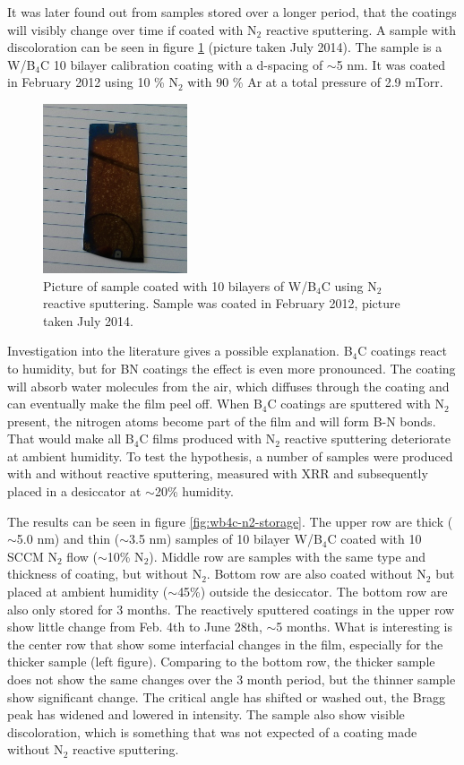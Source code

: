 It was later found out from samples stored over a longer period, that the coatings will visibly change over time if coated with N$_2$ reactive sputtering. A sample with discoloration can be seen in figure \ref{fig:discolor} (picture taken July 2014). The sample is a W/B$_4$C 10 bilayer calibration coating with a d-spacing of $\sim$5 nm. It was coated in February 2012 using 10 \% N$_2$ with 90 \% Ar at a total pressure of 2.9 mTorr.

\begin{figure}[!h]
	\center
	\includegraphics[height=5cm]{figures/athena/coatings/si5556.jpg}
\caption{\footnotesize Picture of sample coated with 10 bilayers of W/B$_4$C using N$_2$ reactive sputtering. Sample was coated in February 2012, picture taken July 2014.}\label{fig:discolor}
\end{figure}

Investigation into the literature gives a possible explanation. B$_4$C coatings react to humidity, but for BN coatings the effect is even more pronounced. The coating will absorb water molecules from the air, which diffuses through the coating and can eventually make the film peel off\cite{Cardinale:1994ha}. When B$_4$C coatings are sputtered with N$_2$ present, the nitrogen atoms become part of the film and will form B-N bonds. That would make all B$_4$C films produced with N$_2$ reactive sputtering deteriorate at ambient humidity. To test the hypothesis, a number of samples were produced with and without reactive sputtering, measured with XRR and subsequently placed in a desiccator at $\sim$20\% humidity.

The results can be seen in figure \ref{fig:wb4c-n2-storage}. The upper row are thick ($\sim$5.0 nm) and thin ($\sim$3.5 nm) samples of 10 bilayer W/B$_4$C coated with 10 SCCM N$_2$ flow ($\sim$10\% N$_2$). Middle row are samples with the same type and thickness of coating, but without N$_2$. Bottom row are also coated without N$_2$ but placed at ambient humidity ($\sim$45\%) outside the desiccator. The bottom row are also only stored for 3 months. The reactively sputtered coatings in the upper row show little change from Feb. 4th to June 28th, $\sim$5 months. What is interesting is the center row that show some interfacial changes in the film, especially for the thicker sample (left figure). Comparing to the bottom row, the thicker sample does not show the same changes over the 3 month period, but the thinner sample show significant change. The critical angle has shifted or washed out, the Bragg peak has widened and lowered in intensity. The sample also show visible discoloration, which is something that was not expected of a coating made without N$_2$ reactive sputtering.

